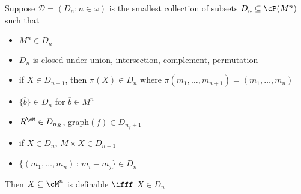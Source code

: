\begin{proposition}
    Suppose $\mathcal{D} = (D_n : n \in \omega)$ is the smallest collection of subsets $D_n \subseteq \cP(M^n)$ such that 
    \begin{itemize}
        \item $M^n \in D_n$
        \item $D_n$ is closed under union, intersection, complement, permutation
        \item if $X \in D_{n+1}$, then $\pi(X) \in D_n$ where $\pi(m_1, \ldots, m_{n+1}) = (m_1, \ldots, m_n)$
        \item $\{\overline{b}\} \in D_n$ for $\overline{b} \in M^n$
        \item $R^{\cM} \in D_{n_R}$, graph$(f) \in D_{n_f +1}$
        \item if $X \in D_n$, $M \times X \in D_{n+1}$
        \item $\{(m_1, \ldots, m_n) \, : \, m_i - m_j\} \in D_n$ 
    \end{itemize}
    Then $X \subseteq \cM^n$ is definable $\ifff$ $X \in D_n$
\end{proposition}


